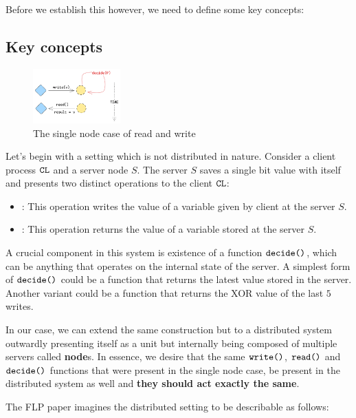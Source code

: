 Before we establish this however, we need to define some key concepts:

\subsection{Key concepts}

\begin{figure}
    \centering
    \includegraphics[width=0.30\textwidth]{time-synchrony-failures/flp-impossibility/assets/flp-single-node-read-write.png}
    \caption{The single node case of read and write}
    \label{fig:flp-single-node-read-write}
\end{figure}

Let's begin with a setting which is not distributed in nature. Consider a client process $\verb|CL|$ and a server node $S$. The server $S$ saves a single bit value with itself and presents two distinct operations to the client $\verb|CL|$: 
\begin{itemize}
    \item {}: This operation writes the value of a variable given by client at the server $S$.
    \item {}: This operation returns the value of a variable stored at the server $S$.
\end{itemize}

A crucial component in this system is existence of a function $\verb|decide()|$, which can be anything that operates on the internal state of the server. A simplest form of $\verb|decide()|$ could be a function that returns the latest value stored in the server. Another variant could be a function that returns the XOR value of the last $5$ writes.

In our case, we can extend the same construction but to a distributed system outwardly presenting itself as a unit but internally being composed of multiple servers called \textbf{node}s. In essence, we desire that the same $\verb|write()|$, $\verb|read()|$ and $\verb|decide()|$ functions that were present in the single node case, be present in the distributed system as well and \textbf{they should act exactly the same}.

The FLP paper imagines the distributed setting to be describable as follows:

